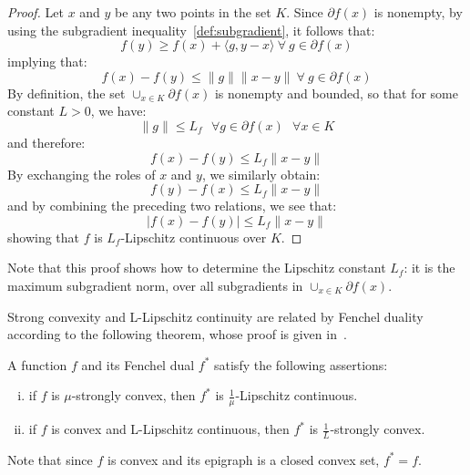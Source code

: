 
\begin{proof}
Let $x$ and $y$ be any two points in the set $K$. Since $\partial f(x)$ is nonempty, by using the subgradient inequality~\ref{def:subgradient}, it follows that:
$$
	f(y) \geq f(x) + \langle g, y - x \rangle \ \forall \ g \in \partial f(x)
$$
implying that:
$$
	f(x) - f(y) \leq \|g\| \|x-y\| \ \forall \ g \in \partial f(x)
$$
By definition, the set $\cup_{x \in K} \partial f(x)$ is nonempty and bounded, so that for some constant $L > 0$, we have:
$$
	\|g\| \leq L_f \ \ \ \forall g \in \partial f(x) \ \ \ \forall x \in K
$$
and therefore:
$$
	f(x) - f(y) \leq L_f \|x-y\|
$$
By exchanging the roles of $x$ and $y$, we similarly obtain:
$$
	f(y) - f(x) \leq L_f \|x-y\|
$$
and by combining the preceding two relations, we see that:
$$
	|f(x) - f(y)| \leq L_f \|x-y\|
$$
showing that $f$ is $L_f$-Lipschitz continuous over $K$.
\end{proof}

Note that this proof shows how to determine the Lipschitz constant $L_f$: it is the maximum subgradient norm, over all subgradients in $\cup_{x \in K} \partial f(x)$.

Strong convexity and L-Lipschitz continuity are related by Fenchel duality according to the following theorem, whose proof is given in~\cite{zhou2018fenchel}.


\begin{theorem}\label{def:strong_cvx_l_lipschitz_convex}
A function $f$ and its Fenchel dual $f^*$ satisfy the following assertions:
\begin{enumerate}[(i)]
		\item if $f$ is $\mu$-strongly convex, then $f^*$ is $\displaystyle \frac{1}{\mu}$-Lipschitz continuous.
		\item if $f$ is convex and L-Lipschitz continuous, then $f^*$ is $\displaystyle \frac{1}{L}$-strongly convex.
\end{enumerate}
\end{theorem}

Note that since $f$ is convex and its epigraph is a closed convex set, $f^* = f$.

\pagebreak

